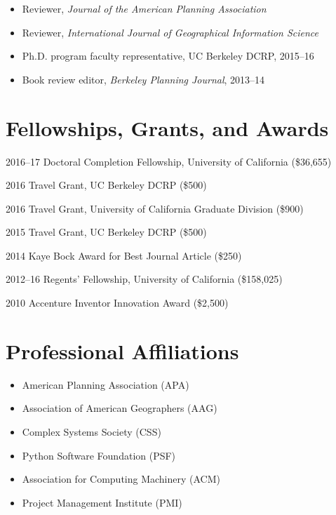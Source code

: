 \documentclass{academiccv}
\begin{document}
\begin{itemize}
\item Reviewer, \emph{Journal of the American Planning Association}
\item Reviewer, \emph{International Journal of Geographical Information Science}
\item Ph.D. program faculty representative, UC Berkeley DCRP, 2015--16
\item Book review editor, \emph{Berkeley Planning Journal}, 2013--14
\end{itemize}


\section*{Fellowships, Grants, and Awards}

\begin{tablist}
\item[2016--17] \tab Doctoral Completion Fellowship, University of California (\$36,655)
\item[2016]     \tab Travel Grant, UC Berkeley DCRP (\$500)
\item[2016]     \tab Travel Grant, University of California Graduate Division (\$900)
\item[2015]     \tab Travel Grant, UC Berkeley DCRP (\$500)
\item[2014]     \tab Kaye Bock Award for Best Journal Article (\$250)
\item[2012--16] \tab Regents' Fellowship, University of California (\$158,025)
\item[2010]     \tab Accenture Inventor Innovation Award (\$2,500)
\end{tablist}



\section*{Professional Affiliations}

\begin{itemize}
\item American Planning Association (APA)
\item Association of American Geographers (AAG)
\item Complex Systems Society (CSS)
\item Python Software Foundation (PSF)
\item Association for Computing Machinery (ACM)
\item Project Management Institute (PMI)
\end{itemize}
\end{document}

